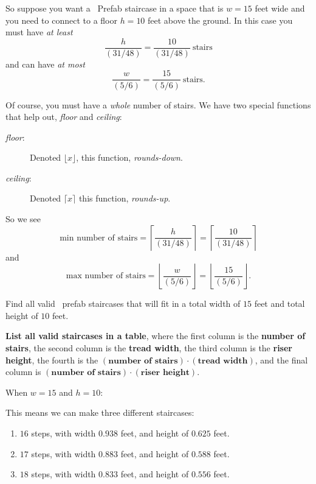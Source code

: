 \documentclass[noauthor,nooutcomes,handout,12pt]{ximera}
\begin{document}
So suppose you want a \mooculus~Prefab staircase in a space that is
$w=15$ feet wide and you need to connect to a floor $h=10$ feet above the
ground. In this case you must have \emph{at least}
\[
\frac{h}{\left(31/48\right)}=\frac{10}{\left(31/48\right)} \ \text{stairs}
\]
and can have \emph{at most}
\[
\frac{w}{\left(5/6\right)}=\frac{15}{\left(5/6\right)} \ \text{stairs}.
\]


Of course, you must have a \emph{whole} number of stairs. We have two special functions that help out, \emph{floor} and \emph{ceiling}:
\begin{description}
\item[\emph{floor}:] Denoted $\lfloor x\rfloor$, this function, \emph{rounds-down}.
\item[\emph{ceiling}:] Denoted $\lceil x\rceil$ this function, \emph{rounds-up}.
\end{description}
So we see
\[
\text{min number of stairs} = \left\lceil \frac{h}{\left(31/48\right)} \right\rceil = \left\lceil \frac{10}{\left(31/48\right)} \right\rceil
\]
and
\[
\text{max number of stairs} =  \left\lfloor \frac{w}{\left(5/6\right)} \right\rfloor=\left\lfloor \frac{15}{\left(5/6\right)} \right\rfloor.
\]


\mynewpage


\begin{question}
  Find all valid \mooculus~prefab staircases that will fit in a total
  width of $15$ feet and total height of $10$ feet.

  \textbf{List all valid staircases in a table}, where the first
  column is the \textbf{number of stairs}, the second column is the
  \textbf{tread width}, the third column is the \textbf{riser height},
  the fourth is the $\boldsymbol{(\textbf{number of stairs}) \cdot (\textbf{tread width})}$, and the final column is $\boldsymbol{(\textbf{number of stairs}) \cdot (\textbf{riser height})}$.

  \begin{freeResponse}
  When $w=15$ and $h=10$:
  
  This means we can make three different staircases:
  \begin{enumerate}
  \item $16$ steps, with width $0.938$ feet, and height of $0.625$ feet.
  \item $17$ steps, with width $0.883$ feet, and height of $0.588$ feet.
  \item $18$ steps, with width $0.833$ feet, and height of $0.556$ feet.
  \end{enumerate}
  \end{freeResponse}
\end{question}
\end{document}
